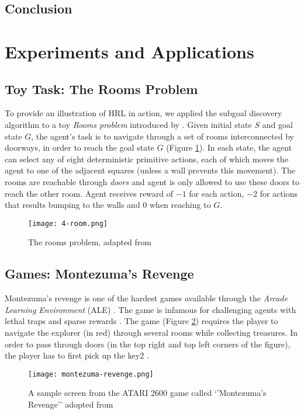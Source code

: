 \documentclass[letterpaper,titlepage]{article}
\begin{document}
\subsection{Conclusion}
\newpage

\section{Experiments and Applications}

\subsection{Toy Task: The Rooms Problem}
To provide an illustration of HRL in action, we applied the subgoal discovery algorithm to a toy \emph{Rooms problem} introduced by \citep{RL-Book:Sutton:1998}. Given initial state $S$ and goal state $G$, the agent's task is to navigate through a set of rooms interconnected by doorways, in order to reach the goal state $G$ (Figure \ref{g:4-room}). In each state, the agent can select any of eight deterministic primitive actions, each of which moves the agent to one of the adjacent squares (unless a wall prevents this movement). The rooms are reachable through \emph{doors} and agent is only allowed to use these doors to reach the other room. Agent receives reward of $-1$ for each action, $-2$ for actions that results bumping to the walls and $0$ when reaching to $G$. 
\begin{figure}[H]
\centering
\texttt{[image: 4-room.png]}
\caption{The rooms problem, adapted from \citep{HRL-BOTVINICK:2009}}
\label{g:4-room}
\end{figure}

\subsection{Games: Montezuma's Revenge}
Montezuma's revenge is one of the hardest games available
through the \emph{Arcade Learning Environment} (ALE) \citep{ALE:Bellemare:2013}. The game is infamous for challenging agents with lethal traps and sparse rewards \citep{FeUdal:HRL:Sahsa:2017}. The game (Figure \ref{g:montezuma-revenge}) requires the player to navigate the explorer (in red) through several rooms while collecting treasures. In order to pass through doors (in the top right and top left corners of the figure), the player has to first pick up the key2 \citep{HRL:MIT:Kulkarni:2016}.
\begin{figure}[H]
\centering
\texttt{[image: montezuma-revenge.png]}
\caption{A sample screen from the ATARI 2600 game called `'Montezuma's Revenge'' adopted from \citep{HRL:MIT:Kulkarni:2016}}
\label{g:montezuma-revenge}
\end{figure}
\end{document}
